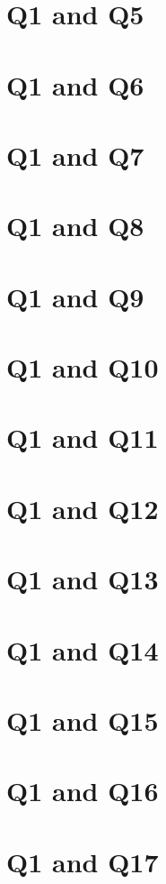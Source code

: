 \documentclass{report}
\begin{document}
\section{Q1 and Q5}\clearpage
\section{Q1 and Q6}\clearpage
\section{Q1 and Q7}\clearpage
\section{Q1 and Q8}\clearpage
\section{Q1 and Q9}\clearpage
\section{Q1 and Q10}\clearpage
\section{Q1 and Q11}\clearpage
\section{Q1 and Q12}\clearpage
\section{Q1 and Q13}\clearpage
\section{Q1 and Q14}\clearpage
\section{Q1 and Q15}\clearpage
\section{Q1 and Q16}\clearpage
\section{Q1 and Q17}\clearpage
\end{document}
